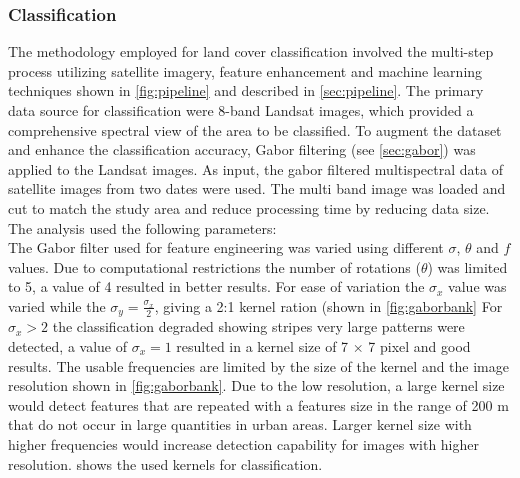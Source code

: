 \documentclass[12pt,a4paper, english,twoside]{scrartcl}
\begin{document}
    \subsubsection{Classification }\label{sec:classification}
      The methodology employed for land cover classification involved the multi-step process utilizing satellite imagery, feature enhancement and machine learning techniques shown in \cref{fig:pipeline} and described in \cref{sec:pipeline}.
      The primary data source for classification were 8-band Landsat images, which provided a comprehensive spectral view of the area to be classified.
      To augment the dataset and enhance the classification accuracy, Gabor filtering (see \cref{sec:gabor}) was applied to the Landsat images.
      As input, the gabor filtered multispectral data of satellite images from two dates were used.
      The multi band image was loaded and cut to match the study area and reduce processing time by reducing data size.  \\
      The analysis used the following parameters: \\
      The Gabor filter used for feature engineering was varied using different $\sigma$, $\theta$ and $f$ values.
      Due to computational restrictions the number of rotations ($\theta$) was limited to 5, a value of 4 resulted in better results. 
      For ease of variation the $\sigma_x$ value was varied while the $\sigma_y = \frac{\sigma_x}{2}$, giving a 2:1 kernel ration (shown in \cref{fig:gaborbank} 
      For $\sigma_x > 2$ the classification degraded showing stripes very large patterns were detected, a value of $\sigma_x = 1$ resulted in a kernel size of 7 $\times$ 7 pixel and good results.
      The usable frequencies are limited by the size of the kernel and the image resolution shown in \cref{fig:gaborbank}.
      Due to the low resolution, a large kernel size would detect features that are repeated with a features size in the range of 200 m that do not occur in large quantities in urban areas. 
      Larger kernel size with higher frequencies would increase detection capability for images with higher resolution. 
     shows the used kernels for classification.
\end{document}
